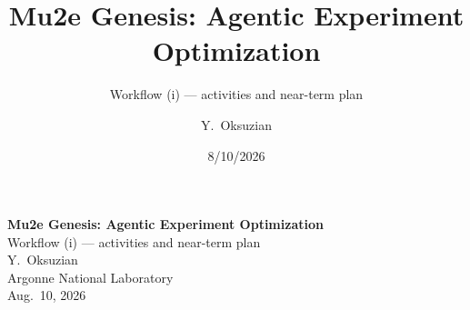 \documentclass[aspectratio=169,10pt]{beamer}
\title{\textcolor{fnalblue}{\textbf{Mu2e Genesis: Agentic Experiment Optimization}}}
\subtitle{\textcolor{fnalblue}{Workflow (i) --- activities and near-term plan}}
\author{Y.\ Oksuzian}
\institute{Argonne National Laboratory}
\date{8/10/2026}
\begin{document}
\begin{frame}[plain]
\vspace{2.2em}
\begin{center}
{\LARGE\bfseries\color{fnalblue} Mu2e Genesis: Agentic Experiment Optimization}\\[0.8em]
{\large\color{fnalblue} Workflow (i) --- activities and near-term plan}\\[3.5em]
{\large Y.\ Oksuzian}\\[0.3em]
{\large Argonne National Laboratory}\\[0.3em]
{\large Aug.\ 10, 2026}
\end{center}
\end{frame}

\end{document}
